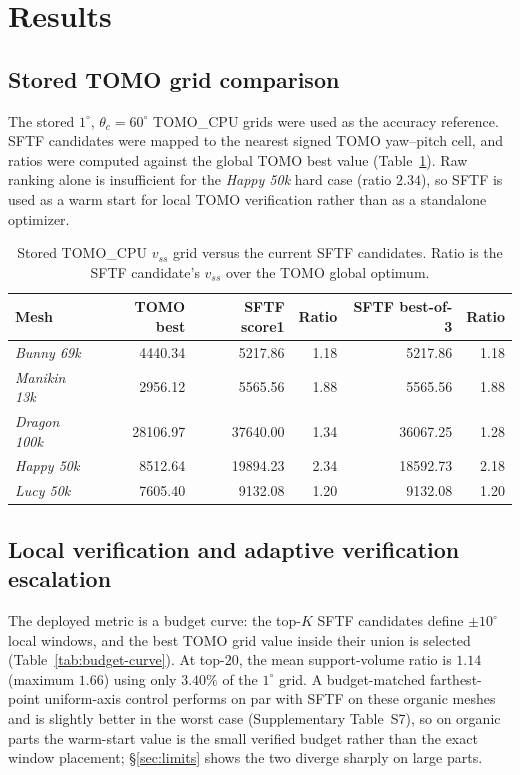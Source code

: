 \documentclass[12pt]{article}
\begin{document}
\section{Results}

\subsection{Stored TOMO grid comparison}
The stored $1^\circ$, $\theta_c=60^\circ$ TOMO\_CPU grids were used as the accuracy
reference. SFTF candidates were mapped to the nearest signed TOMO yaw--pitch cell,
and ratios were computed against the global TOMO best value
(Table~\ref{tab:sftf-tomo-comparison}). Raw ranking alone is insufficient for the
\emph{Happy 50k} hard case (ratio $2.34$), so SFTF is used as a warm start for local
TOMO verification rather than as a standalone optimizer.

\begin{table}[H]
\centering
\caption{Stored TOMO\_CPU $v_{ss}$ grid versus the current SFTF candidates. Ratio is
the SFTF candidate's $v_{ss}$ over the TOMO global optimum.}
\label{tab:sftf-tomo-comparison}
\begin{tabular}{lrrrrr}
\toprule
Mesh & TOMO best & SFTF score1 & Ratio & SFTF best-of-3 & Ratio\\
\midrule
\emph{Bunny 69k} & 4440.34 & 5217.86 & 1.18 & 5217.86 & 1.18\\
\emph{Manikin 13k} & 2956.12 & 5565.56 & 1.88 & 5565.56 & 1.88\\
\emph{Dragon 100k} & 28106.97 & 37640.00 & 1.34 & 36067.25 & 1.28\\
\emph{Happy 50k} & 8512.64 & 19894.23 & 2.34 & 18592.73 & 2.18\\
\emph{Lucy 50k} & 7605.40 & 9132.08 & 1.20 & 9132.08 & 1.20\\
\bottomrule
\end{tabular}
\end{table}

\subsection{Local verification and adaptive verification escalation}
\label{sec:ave}
The deployed metric is a budget curve: the top-$K$ SFTF candidates define
$\pm10^\circ$ local windows, and the best TOMO grid value inside their union is
selected (Table~\ref{tab:budget-curve}). At top-$20$, the mean support-volume ratio
is $1.14$ (maximum $1.66$) using only $3.40\%$ of the $1^\circ$ grid. A budget-matched
farthest-point uniform-axis control performs on par with SFTF on these organic meshes
and is slightly better in the worst case (Supplementary Table~S7), so on organic parts
the warm-start value is the small verified budget rather than the exact window
placement; \S\ref{sec:limits} shows the two diverge sharply on large parts.
\end{document}
